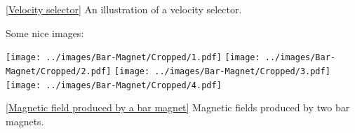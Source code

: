 \documentclass[oneside]{book}
\begin{document}
\begin{itemize}
\begin{center}
\begin{minipage}{0.9\textwidth}
            \hspace*{.2in}
            \captionsetup{type=figure}
            \caption[figure]{\ref{Velocity selector} An illustration of a velocity selector.}
          \end{minipage}
    \end{center}
\end{itemize}
\newpage
Some nice images:
\begin{center}
    \texttt{[image: ../images/Bar-Magnet/Cropped/1.pdf]}
    \texttt{[image: ../images/Bar-Magnet/Cropped/2.pdf]}
    \texttt{[image: ../images/Bar-Magnet/Cropped/3.pdf]}
    \texttt{[image: ../images/Bar-Magnet/Cropped/4.pdf]}
    \captionsetup{type=figure}
    \caption[figure]{\ref{Magnetic field produced by a bar magnet} Magnetic fields produced by two bar magnets.}
\end{center}
\end{document}
